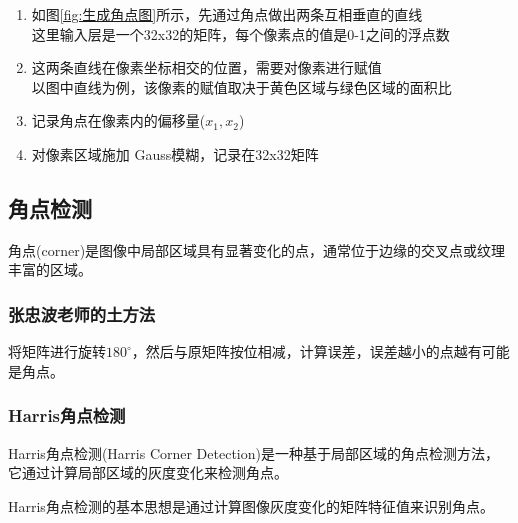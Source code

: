 \documentclass{lzureport}
\begin{document}
\begin{enumerate}[label=\arabic*)]
	\item 如图\ref{fig:生成角点图}所示，先通过角点做出两条互相垂直的直线\\
	这里输入层是一个32x32的矩阵，每个像素点的值是0-1之间的浮点数	
	\item 这两条直线在像素坐标相交的位置，需要对像素进行赋值\\
	以图中直线为例，该像素的赋值取决于黄色区域与绿色区域的面积比
	\item 记录角点在像素内的偏移量($x_1, x_2$)
	\item 对像素区域施加 Gauss模糊，记录在32x32矩阵	
\end{enumerate}

\subsection{角点检测}
角点(corner)是图像中局部区域具有显著变化的点，通常位于边缘的交叉点或纹理丰富的区域。

\subsubsection{张忠波老师的土方法}
将矩阵进行旋转$180^{\circ}$，然后与原矩阵按位相减，计算误差，误差越小的点越有可能是角点。

\subsubsection{Harris角点检测}
Harris角点检测(Harris Corner Detection)是一种基于局部区域的角点检测方法，
它通过计算局部区域的灰度变化来检测角点。

Harris角点检测的\textcolor{YBXPurple}{基本思想}是通过计算图像灰度变化的矩阵特征值来识别角点。
\end{document}
